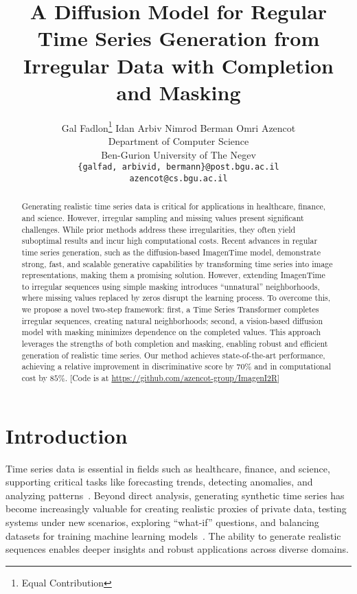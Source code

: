 \documentclass{article}
\title{A Diffusion Model for Regular Time Series Generation from Irregular Data with Completion and Masking}
\author{%
Gal Fadlon\thanks{Equal Contribution} \hspace{0.3em}
Idan Arbiv\footnotemark[1] \hspace{0.3em}
Nimrod Berman \hspace{0.3em}
Omri Azencot \\
Department of Computer Science \\
Ben-Gurion University of The Negev \\
\tt\small{{\{galfad, arbivid, bermann\}@post.bgu.ac.il}} \\
\tt\small{{azencot@cs.bgu.ac.il}} \\
}
\theoremstyle{plain}
\theoremstyle{definition}
\theoremstyle{remark}
\newcommand {\idan}[1]{{\color{red}[#1]}}
\begin{document}
\maketitle


\begin{abstract}
  Generating realistic time series data is critical for applications in healthcare, finance, and science. However, irregular sampling and missing values present significant challenges. While prior methods address these irregularities, they often yield suboptimal results and incur high computational costs. Recent advances in regular time series generation, such as the diffusion-based ImagenTime model, demonstrate strong, fast, and scalable generative capabilities by transforming time series into image representations, making them a promising solution. However, extending ImagenTime to irregular sequences using simple masking introduces ``unnatural'' neighborhoods, where missing values replaced by zeros disrupt the learning process. To overcome this, we propose a novel two-step framework: first, a Time Series Transformer completes irregular sequences, creating natural neighborhoods; second, a vision-based diffusion model with masking minimizes dependence on the completed values. This approach leverages the strengths of both completion and masking, enabling robust and efficient generation of realistic time series. Our method achieves state-of-the-art performance, achieving a relative improvement in discriminative score by $70\%$ and in computational cost by $85\%$. \idan{Code is at \url{https://github.com/azencot-group/ImagenI2R}}
\end{abstract}

\vspace{-5mm}
\section{Introduction}
\label{sec:intro}
\vspace{-2mm}

Time series data is essential in fields such as healthcare, finance, and science, supporting critical tasks like forecasting trends, detecting anomalies, and analyzing patterns~\cite{han2019review, ismail2019deep, lim2021time}. Beyond direct analysis, generating synthetic time series has become increasingly valuable for creating realistic proxies of private data, testing systems under new scenarios, exploring ``what-if'' questions, and balancing datasets for training machine learning models~\cite{brophy2023generative}. The ability to generate realistic sequences enables deeper insights and robust applications across diverse domains.
\end{document}
